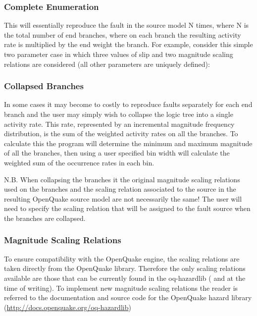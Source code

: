 \subsubsection{Complete Enumeration}

This will essentially reproduce the fault in the source model N times, where N is the total number of end branches, where on each branch the resulting activity rate is multiplied by the end weight the branch. For example, consider this simple two parameter case in which three values of slip and two magnitude scaling relations are considered (all other parameters are uniquely defined):


\subsubsection{Collapsed Branches}

In some cases it may become to costly to reproduce faults separately for each end branch and the user may simply wish to collapse the logic tree into a single activity rate. This rate, represented by an incremental magnitude frequency distribution, is the sum of the weighted activity rates on all the branches. To calculate this the program will determine the minimum and maximum magnitude of all the branches, then using a user specified bin width will calculate the weighted sum of the occurrence rates in each bin. 

N.B. When collapsing the branches it the original magnitude scaling relations used on the branches and the scaling relation associated to the source in the resulting OpenQuake source model are not necessarily the same! The user will need to specify the scaling relation that will be assigned to the fault source when the branches are collapsed. 

\subsubsection{Magnitude Scaling Relations}

To ensure compatibility with the OpenQuake engine, the scaling relations are taken directly from the OpenQuake library. Therefore the only scaling relations available are those that can be currently found in the oq-hazardlib (\citet{wells1994} and \citet{thomas2010} at the time of writing). To implement new magnitude scaling relations the reader is referred to the documentation and source code for the OpenQuake hazard library (\href{http://docs.openquake.org/oq-hazardlib}{http://docs.openquake.org/oq-hazardlib})

